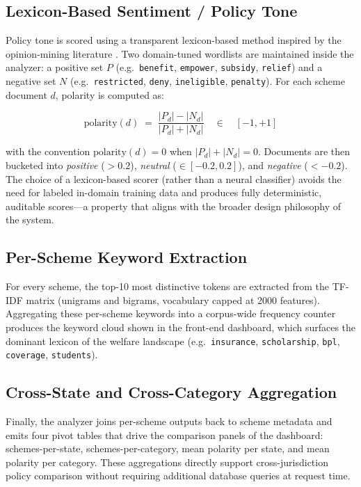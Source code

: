 \documentclass[10pt, journal, twocolumn]{IEEEtran}
\begin{document}
\subsection{Lexicon-Based Sentiment / Policy Tone}
Policy tone is scored using a transparent lexicon-based method inspired by the opinion-mining literature \cite{huliu2004opinion}. Two domain-tuned wordlists are maintained inside the analyzer: a positive set $P$ (e.g.\ \texttt{benefit}, \texttt{empower}, \texttt{subsidy}, \texttt{relief}) and a negative set $N$ (e.g.\ \texttt{restricted}, \texttt{deny}, \texttt{ineligible}, \texttt{penalty}). For each scheme document $d$, polarity is computed as:

\begin{equation}
    \text{polarity}(d) \;=\; \frac{|P_d| - |N_d|}{|P_d| + |N_d|} \quad\in\quad [-1, +1]
\end{equation}

with the convention $\text{polarity}(d)=0$ when $|P_d|+|N_d|=0$. Documents are then bucketed into \emph{positive} ($>0.2$), \emph{neutral} ($\in[-0.2, 0.2]$), and \emph{negative} ($<-0.2$). The choice of a lexicon-based scorer (rather than a neural classifier) avoids the need for labeled in-domain training data and produces fully deterministic, auditable scores---a property that aligns with the broader design philosophy of the system.

\subsection{Per-Scheme Keyword Extraction}
For every scheme, the top-10 most distinctive tokens are extracted from the TF-IDF matrix (unigrams and bigrams, vocabulary capped at 2000 features). Aggregating these per-scheme keywords into a corpus-wide frequency counter produces the keyword cloud shown in the front-end dashboard, which surfaces the dominant lexicon of the welfare landscape (e.g.\ \texttt{insurance}, \texttt{scholarship}, \texttt{bpl}, \texttt{coverage}, \texttt{students}).

\subsection{Cross-State and Cross-Category Aggregation}
Finally, the analyzer joins per-scheme outputs back to scheme metadata and emits four pivot tables that drive the comparison panels of the dashboard: schemes-per-state, schemes-per-category, mean polarity per state, and mean polarity per category. These aggregations directly support cross-jurisdiction policy comparison without requiring additional database queries at request time.
\end{document}
